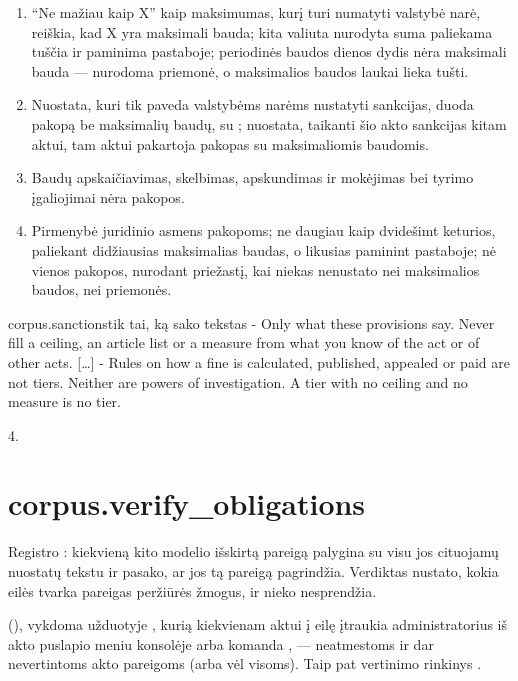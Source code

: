 \begin{enumerate}[itemsep=1pt, topsep=3pt]
  \item \enquote{Ne mažiau kaip X} kaip maksimumas, kurį turi numatyti valstybė narė, reiškia,
    kad X yra maksimali bauda; kita valiuta nurodyta suma paliekama tuščia ir paminima
    pastaboje; periodinės baudos dienos dydis nėra maksimali bauda --- nurodoma priemonė, o
    maksimalios baudos laukai lieka tušti.
  \item Nuostata, kuri tik paveda valstybėms narėms nustatyti sankcijas, duoda pakopą be
    maksimalių baudų, su ; nuostata, taikanti šio akto sankcijas kitam aktui, tam
    aktui pakartoja pakopas su maksimaliomis baudomis.
  \item Baudų apskaičiavimas, skelbimas, apskundimas ir mokėjimas bei tyrimo įgaliojimai nėra
    pakopos.
  \item Pirmenybė juridinio asmens pakopoms; ne daugiau kaip dvidešimt keturios, paliekant
    didžiausias maksimalias baudas, o likusias paminint pastaboje; nė vienos pakopos, nurodant
    priežastį, kai niekas nenustato nei maksimalios baudos, nei priemonės.
\end{enumerate}

\par\nopagebreak
\begin{promptexcerpt}{corpus.sanctions}{tik tai, ką sako tekstas}
- Only what these provisions say. Never fill a ceiling, an article list or a measure from what you know of the act or of other acts.
[…]
- Rules on how a fine is calculated, published, appealed or paid are not tiers. Neither are powers of investigation. A tier with no ceiling and no measure is no tier.
\end{promptexcerpt}

 4.


\section{corpus.verify\_obligations}\label{sec:aprompts:corpus-verify_obligations}

 Registro : kiekvieną kito modelio išskirtą pareigą
palygina su visu jos cituojamų nuostatų tekstu ir pasako, ar jos tą pareigą pagrindžia.
Verdiktas nustato, kokia eilės tvarka pareigas peržiūrės žmogus, ir nieko nesprendžia.

  (), vykdoma
užduotyje , kurią kiekvienam aktui į eilę įtraukia administratorius iš
akto puslapio meniu konsolėje arba komanda , --- neatmestoms ir dar
nevertintoms akto pareigoms (arba vėl visoms). Taip pat vertinimo rinkinys .

